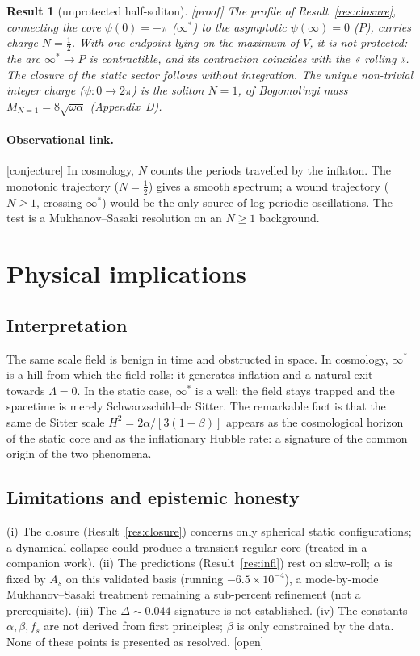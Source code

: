 \documentclass[11pt,a4paper]{article}
\newcommand{\statut}[1]{{\footnotesize\textsf{[#1]}}}
\theoremstyle{plain}
\newtheorem{result}{Result}
\theoremstyle{remark}
\begin{document}
\begin{result}[unprotected half-soliton]\label{res:topo}
\statut{proof} The profile of Result~\ref{res:closure}, connecting the core $\psi(0)=-\pi$
($\infty^*$) to the asymptotic $\psi(\infty)=0$ ($P$), carries charge $N=\tfrac12$. With one
endpoint lying on the maximum of $V$, it is not protected: the arc $\infty^*\!\to P$ is
contractible, and its contraction coincides with the « rolling ». The closure of the static
sector follows without integration. The unique non-trivial integer charge ($\psi:0\to2\pi$)
is the soliton $N=1$, of Bogomol'nyi mass $M_{N=1}=8\sqrt{\omega\alpha}$ (Appendix~D).
\end{result}

\paragraph{Observational link.} \statut{conjecture} In cosmology, $N$ counts the periods
travelled by the inflaton. The monotonic trajectory ($N=\tfrac12$) gives a smooth spectrum;
a wound trajectory ($N\ge1$, crossing $\infty^*$) would be the only source of log-periodic
oscillations. The test is a Mukhanov--Sasaki resolution on an $N\ge1$ background.

\section{Physical implications}
\subsection{Interpretation}
The same scale field is benign in time and obstructed in space. In cosmology, $\infty^*$ is a
hill from which the field rolls: it generates inflation and a natural exit towards
$\Lambda=0$. In the static case, $\infty^*$ is a well: the field stays trapped and the
spacetime is merely Schwarzschild--de Sitter. The remarkable fact is that the same de Sitter
scale $H^2=2\alpha/[3(1-\beta)]$ appears as the cosmological horizon of the static core and
as the inflationary Hubble rate: a signature of the common origin of the two phenomena.

\subsection{Limitations and epistemic honesty}
(i) The closure (Result~\ref{res:closure}) concerns only spherical static configurations; a
dynamical collapse could produce a transient regular core (treated in a companion work).
(ii) The predictions (Result~\ref{res:infl}) rest on slow-roll; $\alpha$ is fixed by $A_s$ on
this validated basis (running $-6.5\times10^{-4}$), a mode-by-mode Mukhanov--Sasaki treatment
remaining a sub-percent refinement (not a prerequisite). (iii) The $\Delta\sim0.044$
signature is not established. (iv) The constants $\alpha,\beta,f_s$ are not derived from
first principles; $\beta$ is only constrained by the data. None of these points is presented
as resolved. \statut{open}
\end{document}
